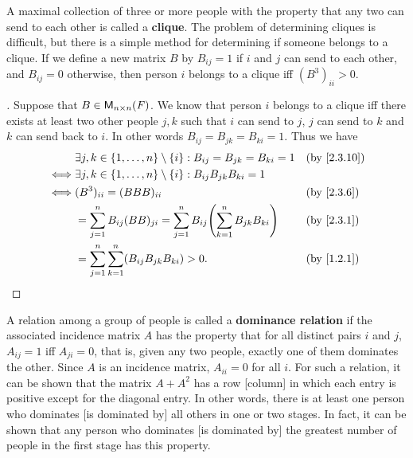 \begin{eg}\label{2.3.10}
	A maximal collection of three or more people with the property that any two can send to each other is called a \textbf{clique}.
	The problem of determining cliques is difficult, but there is a simple method for determining if someone belongs to a clique.
	If we define a new matrix \(B\) by \(B_{i j} = 1\) if \(i\) and \(j\) can send to each other, and \(B_{i j} = 0\) otherwise, then person \(i\) belongs to a clique iff \((B^3)_{i i} > 0\).
\end{eg}

\begin{proof}[]
	Suppose that \(B \in \ms[n][n][\F]\).
	We know that person \(i\) belongs to a clique iff there exists at least two other people \(j, k\) such that \(i\) can send to \(j\), \(j\) can send to \(k\) and \(k\) can send back to \(i\).
	In other words \(B_{i j} = B_{j k} = B_{k i} = 1\).
	Thus we have
	\begin{align*}
		     & \exists j, k \in \set{1, \dots, n} \setminus \set{i} : B_{i j} = B_{j k} = B_{k i} = 1           &  & \by{2.3.10} \\
		\iff & \exists j, k \in \set{1, \dots, n} \setminus \set{i} : B_{i j} B_{j k} B_{k i} = 1                                \\
		\iff & (B^3)_{i i} = (BBB)_{i i}                                                                        &  & \by{2.3.6}  \\
		     & = \sum_{j = 1}^n B_{i j} (BB)_{j i} = \sum_{j = 1}^n B_{i j} \pa{\sum_{k = 1}^n B_{j k} B_{k i}} &  & \by{2.3.1}  \\
		     & = \sum_{j = 1}^n \sum_{k = 1}^n (B_{i j} B_{j k} B_{k i}) > 0.                                   &  & \by{1.2.1}
	\end{align*}
\end{proof}

\begin{eg}\label{2.3.11}
	A relation among a group of people is called a \textbf{dominance relation} if the associated incidence matrix \(A\) has the property that for all distinct pairs \(i\) and \(j\), \(A_{i j} = 1\) iff \(A_{j i} = 0\), that is, given any two people, exactly one of them dominates the other.
	Since \(A\) is an incidence matrix, \(A_{i i} = 0\) for all \(i\).
	For such a relation, it can be shown that the matrix \(A + A^2\) has a row [column] in which each entry is positive except for the diagonal entry.
	In other words, there is at least one person who dominates [is dominated by] all others in one or two stages.
	In fact, it can be shown that any person who dominates [is dominated by] the greatest number of people in the first stage has this property.
\end{eg}

